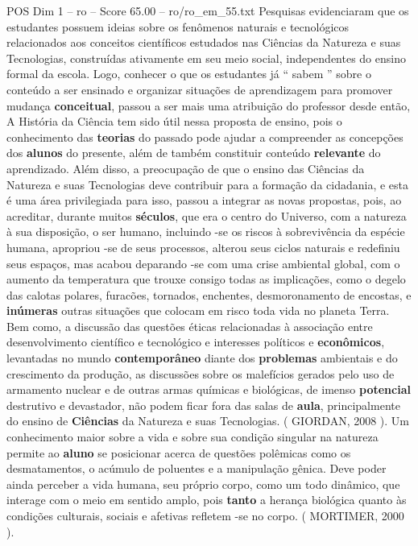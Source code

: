 \begin{textsample}{POS Dim 1 – ro – Score 65.00 – ro/ro\_em\_55.txt}
Pesquisas evidenciaram que os estudantes possuem ideias sobre os fenômenos naturais e tecnológicos relacionados aos conceitos científicos estudados nas Ciências da Natureza e suas Tecnologias, construídas ativamente em seu meio social, independentes do ensino formal da escola.
Logo, conhecer o que os estudantes já “ sabem ” sobre o conteúdo a ser ensinado e organizar situações de aprendizagem para promover mudança \textbf{conceitual}, passou a ser mais uma atribuição do professor desde então, A História da Ciência tem sido útil nessa proposta de ensino, pois o conhecimento das \textbf{teorias} do passado pode ajudar a compreender as concepções dos \textbf{alunos} do presente, além de também constituir conteúdo \textbf{relevante} do aprendizado.
Além disso, a preocupação de que o ensino das Ciências da Natureza e suas Tecnologias deve contribuir para a formação da cidadania, e esta é uma área privilegiada para isso, passou a integrar as novas propostas, pois, ao acreditar, durante muitos \textbf{séculos}, que era o centro do Universo, com a natureza à sua disposição, o ser humano, incluindo -se os riscos à sobrevivência da espécie humana, apropriou -se de seus processos, alterou seus ciclos naturais e redefiniu seus espaços, mas acabou deparando -se com uma crise ambiental global, com o aumento da temperatura que trouxe consigo todas as implicações, como o degelo das calotas polares, furacões, tornados, enchentes, desmoronamento de encostas, e \textbf{inúmeras} outras situações que colocam em risco toda vida no planeta Terra.
Bem como, a discussão das questões éticas relacionadas à associação entre desenvolvimento científico e tecnológico e interesses políticos e \textbf{econômicos}, levantadas no mundo \textbf{contemporâneo} diante dos \textbf{problemas} ambientais e do crescimento da produção, as discussões sobre os malefícios gerados pelo uso de armamento nuclear e de outras armas químicas e biológicas, de imenso \textbf{potencial} destrutivo e devastador, não podem ficar fora das salas de \textbf{aula}, principalmente do ensino de \textbf{Ciências} da Natureza e suas Tecnologias. ( GIORDAN, 2008 ).
Um conhecimento maior sobre a vida e sobre sua condição singular na natureza permite ao \textbf{aluno} se posicionar acerca de questões polêmicas como os desmatamentos, o acúmulo de poluentes e a manipulação gênica.
Deve poder ainda perceber a vida humana, seu próprio corpo, como um todo dinâmico, que interage com o meio em sentido amplo, pois \textbf{tanto} a herança biológica quanto às condições culturais, sociais e afetivas refletem -se no corpo. ( MORTIMER, 2000 ).

\end{textsample}
